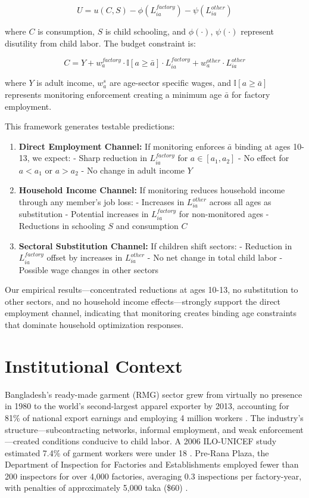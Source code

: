 \documentclass[12pt]{article}
\begin{document}
$$U = u(C, S) - \phi(L_{ia}^{factory}) - \psi(L_{ia}^{other})$$

where $C$ is consumption, $S$ is child schooling, and $\phi(\cdot)$, $\psi(\cdot)$ represent disutility from child labor. The budget constraint is:

$$C = Y + w_a^{factory} \cdot \mathbb{I}[a \geq \bar{a}] \cdot L_{ia}^{factory} + w_a^{other} \cdot L_{ia}^{other}$$

where $Y$ is adult income, $w_a^s$ are age-sector specific wages, and $\mathbb{I}[a \geq \bar{a}]$ represents monitoring enforcement creating a minimum age $\bar{a}$ for factory employment.

This framework generates testable predictions:

\begin{enumerate}
\item \textbf{Direct Employment Channel:} If monitoring enforces $\bar{a}$ binding at ages 10-13, we expect:
   - Sharp reduction in $L_{ia}^{factory}$ for $a \in [a_1,a_2]$
   - No effect for $a < a_1$ or $a > a_2$
   - No change in adult income $Y$
   
\item \textbf{Household Income Channel:} If monitoring reduces household income through any member's job loss:
   - Increases in $L_{ia}^{other}$ across all ages as substitution
   - Potential increases in $L_{ia}^{factory}$ for non-monitored ages
   - Reductions in schooling $S$ and consumption $C$
   
\item \textbf{Sectoral Substitution Channel:} If children shift sectors:
   - Reduction in $L_{ia}^{factory}$ offset by increases in $L_{ia}^{other}$
   - No net change in total child labor
   - Possible wage changes in other sectors
\end{enumerate}

Our empirical results—concentrated reductions at ages 10-13, no substitution to other sectors, and no household income effects—strongly support the direct employment channel, indicating that monitoring creates binding age constraints that dominate household optimization responses.

\section{Institutional Context}

Bangladesh's ready-made garment (RMG) sector grew from virtually no presence in 1980 to the world's second-largest apparel exporter by 2013, accounting for 81\% of national export earnings and employing 4 million workers \citep{saxena2014expansion, mostafa2014economic}. The industry's structure---subcontracting networks, informal employment, and weak enforcement---created conditions conducive to child labor. A 2006 ILO-UNICEF study estimated 7.4\% of garment workers were under 18 \cite{ilo2006baseline}. Pre-Rana Plaza, the Department of Inspection for Factories and Establishments employed fewer than 200 inspectors for over 4,000 factories, averaging 0.3 inspections per factory-year, with penalties of approximately 5,000 taka (\$60) \citep{ahmed2013compliance, kabeer2019my}.
\end{document}
